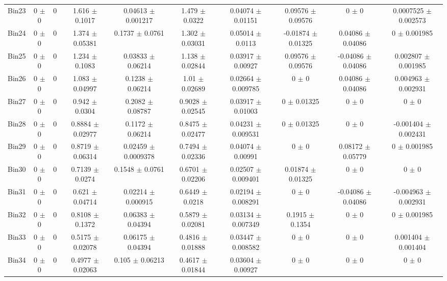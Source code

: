 \begin{tabular}{@{\extracolsep{4pt}}lccccccccc@{}}
     Bin23 & 0 $\pm$ 0 & 0 & 1.616 $\pm$ 0.1017 & 0.04613 $\pm$ 0.001217 & 1.479 $\pm$ 0.0322 & 0.04074 $\pm$ 0.01151 & 0.09576 $\pm$ 0.09576 & 0 $\pm$ 0 & 0.0007525 $\pm$ 0.002573 \\ 
     Bin24 & 0 $\pm$ 0 & 0 & 1.374 $\pm$ 0.05381 & 0.1737 $\pm$ 0.0761 & 1.302 $\pm$ 0.03031 & 0.05014 $\pm$ 0.0113 & -0.01874 $\pm$ 0.01325 & 0.04086 $\pm$ 0.04086 & 0 $\pm$ 0.001985 \\ 
     Bin25 & 0 $\pm$ 0 & 0 & 1.234 $\pm$ 0.1083 & 0.03833 $\pm$ 0.06214 & 1.138 $\pm$ 0.02844 & 0.03917 $\pm$ 0.00927 & 0.09576 $\pm$ 0.09576 & -0.04086 $\pm$ 0.04086 & 0.002807 $\pm$ 0.001985 \\ 
     Bin26 & 0 $\pm$ 0 & 0 & 1.083 $\pm$ 0.04997 & 0.1238 $\pm$ 0.06214 & 1.01 $\pm$ 0.02689 & 0.02664 $\pm$ 0.009785 & 0 $\pm$ 0 & 0.04086 $\pm$ 0.04086 & 0.004963 $\pm$ 0.002931 \\ 
     Bin27 & 0 $\pm$ 0 & 0 & 0.942 $\pm$ 0.0304 & 0.2082 $\pm$ 0.08787 & 0.9028 $\pm$ 0.02545 & 0.03917 $\pm$ 0.01003 & 0 $\pm$ 0.01325 & 0 $\pm$ 0 & 0 $\pm$ 0 \\ 
     Bin28 & 0 $\pm$ 0 & 0 & 0.8884 $\pm$ 0.02977 & 0.1172 $\pm$ 0.06214 & 0.8475 $\pm$ 0.02477 & 0.04231 $\pm$ 0.009531 & 0 $\pm$ 0.01325 & 0 $\pm$ 0 & -0.001404 $\pm$ 0.002431 \\ 
     Bin29 & 0 $\pm$ 0 & 0 & 0.8719 $\pm$ 0.06314 & 0.02459 $\pm$ 0.0009378 & 0.7494 $\pm$ 0.02336 & 0.04074 $\pm$ 0.00991 & 0 $\pm$ 0 & 0.08172 $\pm$ 0.05779 & 0 $\pm$ 0.001985 \\ 
     Bin30 & 0 $\pm$ 0 & 0 & 0.7139 $\pm$ 0.0274 & 0.1548 $\pm$ 0.0761 & 0.6701 $\pm$ 0.02206 & 0.02507 $\pm$ 0.009401 & 0.01874 $\pm$ 0.01325 & 0 $\pm$ 0 & 0 $\pm$ 0 \\ 
     Bin31 & 0 $\pm$ 0 & 0 & 0.621 $\pm$ 0.04714 & 0.02214 $\pm$ 0.000915 & 0.6449 $\pm$ 0.0218 & 0.02194 $\pm$ 0.008291 & 0 $\pm$ 0 & -0.04086 $\pm$ 0.04086 & -0.004963 $\pm$ 0.002931 \\ 
     Bin32 & 0 $\pm$ 0 & 0 & 0.8108 $\pm$ 0.1372 & 0.06383 $\pm$ 0.04394 & 0.5879 $\pm$ 0.02081 & 0.03134 $\pm$ 0.007349 & 0.1915 $\pm$ 0.1354 & 0 $\pm$ 0 & 0 $\pm$ 0.001985 \\ 
     Bin33 & 0 $\pm$ 0 & 0 & 0.5175 $\pm$ 0.02078 & 0.06175 $\pm$ 0.04394 & 0.4816 $\pm$ 0.01888 & 0.03447 $\pm$ 0.008582 & 0 $\pm$ 0 & 0 $\pm$ 0 & 0.001404 $\pm$ 0.001404 \\ 
     Bin34 & 0 $\pm$ 0 & 0 & 0.4977 $\pm$ 0.02063 & 0.105 $\pm$ 0.06213 & 0.4617 $\pm$ 0.01844 & 0.03604 $\pm$ 0.00927 & 0 $\pm$ 0 & 0 $\pm$ 0 & 0 $\pm$ 0 \\ 

\end{tabular}
